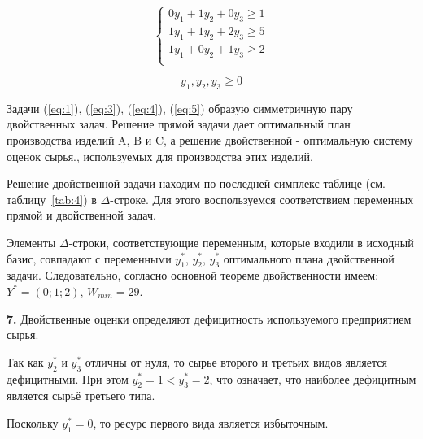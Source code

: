 \begin{equation}\label{eq:4}
  \begin{cases}
    0 y_1 + 1 y_2 + 0 y_3 \geq 1 \\
    1 y_1 + 1 y_2 + 2 y_3 \geq 5 \\
    1 y_1 + 0 y_2 + 1 y_3 \geq 2 \\
  \end{cases}
\end{equation}

\begin{equation}\label{eq:5}
  y_1, y_2, y_3 \geq 0
\end{equation}

Задачи (\ref{eq:1}), (\ref{eq:3}), (\ref{eq:4}), (\ref{eq:5}) образую симметричную пару двойственных задач.
Решение прямой задачи дает оптимальный план производства изделий A, B и C,
а решение двойственной - оптимальную систему оценок сырья., используемых для производства этих изделий.

Решение двойственной задачи находим по последней симплекс таблице (см. таблицу~\ref{tab:4}) в $\Delta$-строке.
Для этого воспользуемся соответствием переменных прямой и двойственной задач.

Элементы $\Delta$-строки, соответствующие переменным, которые входили в исходный базис, совпадают с переменными
$y_1^*$, $y_2^*$, $y_3^*$ оптимального плана двойственной задачи.
Следовательно, согласно основной теореме двойственности имеем: $Y^* = (0;1;2)$, $W_{min}=29$.

\textbf{7.}
Двойственные оценки определяют дефицитность используемого предприятием сырья.

Так как $y_2^*$ и $y_3^*$ отличны от нуля, то сырье второго и третьих видов является дефицитными.
При этом $y_2^* = 1 < y_3^* = 2$, что означает, что наиболее дефицитным является сырьё третьего типа.

Поскольку $y_1^* = 0$, то ресурс первого вида является избыточным.
